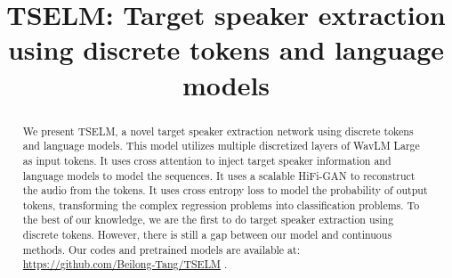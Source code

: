 \documentclass[conference]{IEEEtran}
\begin{document}
\title{TSELM: Target speaker extraction using discrete tokens and language models
}

\author{
\and
{}
\and
{}
}

\maketitle

\begin{abstract}
We present TSELM, a novel target speaker extraction network using discrete tokens and language models. This model utilizes multiple discretized layers
of WavLM Large as input tokens. It uses cross attention to inject target speaker information and language models to model the sequences. It uses 
a scalable HiFi-GAN to reconstruct the audio from the tokens. It uses 
cross entropy loss to model the probability of output tokens, transforming the complex regression problems into classification problems. To the best of our 
knowledge, we are the first to do target speaker extraction using discrete tokens. However, there is still a gap between our model and continuous methods. 
Our codes and pretrained models are available at: \href{https://github.com/Beilong-Tang/TSELM}{https://github.com/Beilong-Tang/TSELM} .
\end{abstract}
\end{document}
